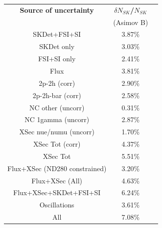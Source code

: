\begin{table}[htb]
\centering
\begin{tabular}{| c | c | c |}
\hline
  {\bf Source of uncertainty}    & \multicolumn{1}{c|}{{\bf ${\delta}N_{SK}$/$N_{SK}$}}\\
                                 & \multicolumn{1}{c|}{(Asimov B)}\\

\hline
\hline  
SKDet+FSI+SI                   & 3.87\%                        \\
SKDet only                   & 3.03\%                        \\
FSI+SI only                   & 2.41\%                        \\
\hline
  Flux                           & 3.81\%                        \\
\hline
\hline
  2p-2h (corr)                     & 2.90\%                        \\
  2p-2h-bar (corr)                  & 2.58\%                        \\
  NC other (uncorr)              & 0.31\%                        \\
  NC 1gamma (uncorr)             & 2.87\%                        \\
  XSec nue/numu (uncorr)                 & 1.70\%                        \\
\hline  
  XSec Tot (corr)                  & 4.37\%                        \\
  XSec Tot                       & 5.51\%                        \\
\hline
\hline
 Flux+XSec (ND280 constrained)                      & 3.20\%                        \\
 Flux+XSec (All)	                     & 4.63\%                        \\
\hline
\hline
  Flux+XSec+SKDet+FSI+SI         & 6.24\%                        \\
\hline
\hline
  Oscillations                   & 3.61\%                        \\
\hline
\hline
  All                            & 7.08\%                        \\
\hline
\hline


\end{tabular}
\end{table}
